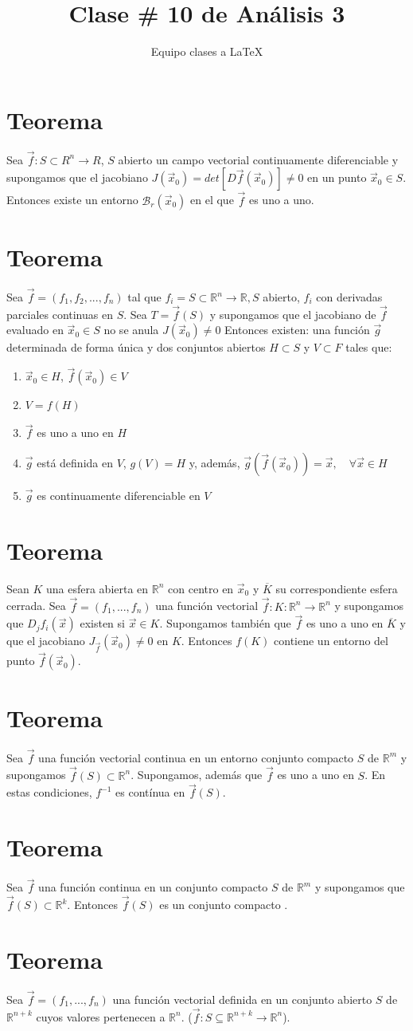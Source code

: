\documentclass[12pt]{article}
\title{Clase \# 10 de Análisis 3}
\author{Equipo clases a \LaTeX}
\let\conjugatet\overline
\newcommand{\teorema}{\section{Teorema}}
\newcommand{\bola}[2]{\mathcal{B}_{#1}(#2)}
\begin{document}
	
	\maketitle
	\tableofcontents
	
	
	\teorema
	 
	Sea $\vec{f}: S\subset R^n\rightarrow R$, $S$ abierto un campo vectorial continuamente diferenciable y supongamos que el jacobiano $J(\vec{x}_0)=det[D\vec{f}	(\vec{x}_0)]\neq 0$ en un punto $\vec{x}_0\in S$. Entonces existe un entorno $\bola{r}{\vec{x}_0}$ en el que $\vec{f}$ es uno a uno.
	
	\teorema 
	Sea $\vec{f}=(f_1,f_2,...,f_n)$ tal que $f_i=S\subset \mathbb{R}^n\rightarrow \mathbb{R}, S$ abierto, $f_i$ con derivadas parciales continuas en $S$. Sea $T=\vec{f}(S)$ y supongamos que el jacobiano de $\vec{f}$ evaluado en $\vec{x}_0\in S$ no se anula $J(\vec{x}_0)\neq 0$ Entonces existen: una función $\vec{g}$ determinada de forma única y dos conjuntos abiertos $H\subset S$ y $V \subset F$ tales que:
	\begin{enumerate}
	\item ${\vec{x}_0}\in H$, $\vec{f}(\vec{x}_0)\in V$
	\item $V=f(H)$
	\item $\vec{f}$ es uno a uno en $H$
	\item $\vec{g}$ está definida en $V$, $g(V)=H$ y, además,  $\vec{g}(\vec{f}(\vec{x}_0))=\vec{x},\quad \forall \vec{x}\in H$
	\item $\vec{g}$ es continuamente diferenciable en $V$
	\end{enumerate}
	\teorema
	Sean $K$ una esfera abierta en $\mathbb{R}^n$ con centro en $\vec{x}_0$ y $\conjugatet{K}$ su correspondiente esfera cerrada. Sea $\vec{f}=(f_1,...,f_n)$ una función vectorial $\vec{f}: K: \mathbb{R}^n\rightarrow \mathbb{R}^n$ y supongamos que $D_jf_i(\vec{x})$ existen si $\vec{x}\in K$. Supongamos también que $\vec{f}$ es uno a uno en $\conjugatet{K}$ y que el jacobiano $J_{\vec{f}}(\vec{x}_0)\neq 0$ en $K$. Entonces $f(K)$ contiene  un entorno del punto $\vec{f}(\vec{x}_0)$.
	\teorema
	Sea $\vec{f}$ una función vectorial continua en un entorno conjunto compacto  $S$ de $\mathbb{R}^m$ y supongamos $\vec{f}(S)\subset \mathbb{R}^n$. Supongamos, además que $\vec{f}$ es uno a uno en $S$. En estas condiciones, $f^{-1}$ es contínua en $\vec{f}(S)$.
	\teorema
	Sea $\vec{f}$ una función continua  en un conjunto compacto $S$ de $\mathbb{R}^m$ y supongamos que $\vec{f}(S)\subset\mathbb{R}^k$. Entonces $\vec{f}(S)$ es un conjunto compacto	.
	\teorema
	Sea $\vec{f}=(f_1, ...,f_n)$ una función vectorial definida en un conjunto abierto  $S$ de $\mathbb{R}^{n+k}$ cuyos valores pertenecen  a $\mathbb{R}^n$. ($\vec{f}:S\subseteq \mathbb{R}^{n+k}\rightarrow \mathbb{R}^n$).\\
	
\end{document}
